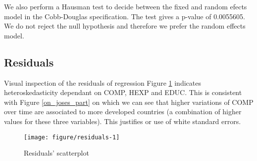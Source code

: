 \documentclass[12pt,a4paper]{article}\usepackage[]{graphicx}\usepackage[]{color}
\makeatletter
\def\maxwidth{ %
  \ifdim\Gin@nat@width>\linewidth
    \linewidth
  \else
    \Gin@nat@width
  \fi
}
\newenvironment{knitrout}{}{} %
\makeatother
\begin{document}
We also perform a Hausman test to decide between the fixed and random efects model in the Cobb-Douglas specification. The test gives a p-value of 0.0055605. We do not reject the null hypothesis and therefore we prefer the random effects model.


\subsection{Residuals}
Visual inspection of the residuals of regression Figure \ref{fig:residuals} indicates heteroskedasticity dependant on COMP, HEXP and EDUC. This is consistent with Figure \ref{on_joses_part} on which we can see that higher variations of COMP over time are associated to more developed countries (a combination of higher values for these three variables). This justifies or use of white standard errors.
\begin{knitrout}
\color{fgcolor}\begin{figure}[!htbp]

{\centering \texttt{[image: figure/residuals-1]} 

}

\caption[Residuals' scatterplot]{Residuals' scatterplot}\label{fig:residuals}
\end{figure}


\end{knitrout}

\end{document}
